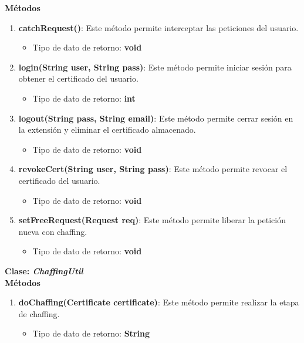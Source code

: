 \documentclass[12pt, a4paper, titlepage]{report}
\begin{document}
		            \textbf{Métodos}
    		        \begin{enumerate}
    		            \item \textbf{catchRequest()}: Este método permite interceptar las peticiones del usuario.
    		            \begin{itemize}
    		                \item Tipo de dato de retorno: \textbf{void}
    		            \end{itemize}
    		            \item \textbf{login(String user, String pass)}: Este método permite iniciar sesión para obtener el certificado del usuario.
    		            \begin{itemize}
    		                \item Tipo de dato de retorno: \textbf{int}
    		            \end{itemize}
    		            \item \textbf{logout(String pass, String email)}: Este método permite cerrar sesión en la extensión y eliminar el certificado almacenado.
    		            \begin{itemize}
    		                \item Tipo de dato de retorno: \textbf{void}
    		            \end{itemize}
    		            \item \textbf{revokeCert(String user, String pass)}: Este método permite revocar el certificado del usuario.
    		            \begin{itemize}
    		                \item Tipo de dato de retorno: \textbf{void}
    		            \end{itemize}
    		            \item \textbf{setFreeRequest(Request req)}: Este método permite liberar la petición nueva con chaffing.
    		            \begin{itemize}
    		                \item Tipo de dato de retorno: \textbf{void}
    		            \end{itemize}
    		        \end{enumerate}
    		        
    		        
    		        \textbf{\textcolor{guindapoli}{Clase: \textit{ChaffingUtil}}}\\
                  
		            \textbf{Métodos}
    		        \begin{enumerate}
    		            \item \textbf{doChaffing(Certificate certificate)}: Este método permite realizar la etapa de chaffing.
    		            \begin{itemize}
    		                \item Tipo de dato de retorno: \textbf{String}
    		            \end{itemize}
    		        \end{enumerate}
    		        
\end{document}
